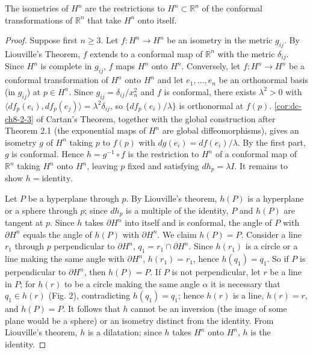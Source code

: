 \begin{theorem}
  \label{thm:dc-ch8-5-3}
  The isometries of $H^n$ are the restrictions to $H^n\subset\mathbb{R}^n$ of the
  conformal transformations of $\mathbb{R}^n$ that take $H^n$ onto itself.
\end{theorem}
\begin{proof}
  Suppose first $n\geq 3$. Let $f:H^n\to H^n$ be an isometry in the metric
  $g_{ij}$. By Liouville's Theorem, $f$ extends to a conformal map of $\mathbb{R}^n$
  with the metric $\delta_{ij}$. Since $H^n$ is complete in $g_{ij}$, $f$ maps $H^n$
  onto $H^n$. Conversely, let $f:H^n\to H^n$ be a conformal transformation of $H^n$
  onto $H^n$ and let $e_1,\dots,e_n$ be an orthonormal basis (in $g_{ij}$) at
  $p\in H^n$. Since $g_{ij}=\delta_{ij}/x_n^2$ and $f$ is conformal, there exists
  $\lambda^2>0$ with $\langle df_p(e_i),df_p(e_j)\rangle=\lambda^2\delta_{ij}$, so
  $\{df_p(e_i)/\lambda\}$ is orthonormal at $f(p)$. \cref{cor:dc-ch8-2-3} of Cartan's
  Theorem, together with the global construction after Theorem 2.1 (the exponential
  maps of $H^n$ are global diffeomorphisms), gives an isometry $g$ of $H^n$ taking
  $p$ to $f(p)$ with $dg(e_i)=df(e_i)/\lambda$. By the first part, $g$ is conformal. Hence
  $h=g^{-1}\circ f$ is the restriction to $H^n$ of a conformal map of $\mathbb{R}^n$
  taking $H^n$ onto $H^n$, leaving $p$ fixed and satisfying $dh_p=\lambda I$. It
  remains to show $h=\text{identity}$.
  
  Let $P$ be a hyperplane through $p$. By Liouville's theorem, $h(P)$ is a hyperplane
  or a sphere through $p$; since $dh_p$ is a multiple of the identity, $P$ and $h(P)$
  are tangent at $p$. Since $h$ takes $\partial H^n$ into itself and is conformal,
  the angle of $P$ with $\partial H^n$ equals the angle of $h(P)$ with $\partial H^n$.
  We claim $h(P)=P$. Consider a line $r_1$ through $p$ perpendicular to
  $\partial H^n$, $q_1=r_1\cap\partial H^n$. Since $h(r_1)$ is a circle or a line
  making the same angle with $\partial H^n$, $h(r_1)=r_1$, hence $h(q_1)=q_1$. So if
  $P$ is perpendicular to $\partial H^n$, then $h(P)=P$. If $P$ is not perpendicular,
  let $r$ be a line in $P$; for $h(r)$ to be a circle making the same angle
  $\alpha$ it is necessary that $q_1\in h(r)$ (Fig. 2), contradicting $h(q_1)=q_1$;
  hence $h(r)$ is a line, $h(r)=r$, and $h(P)=P$. It follows that $h$ cannot be an
  inversion (the image of some plane would be a sphere) or an isometry distinct from
  the identity. From Liouville's theorem, $h$ is a dilatation; since $h$ takes $H^n$
  onto $H^n$, $h$ is the identity.
  

\end{proof}
